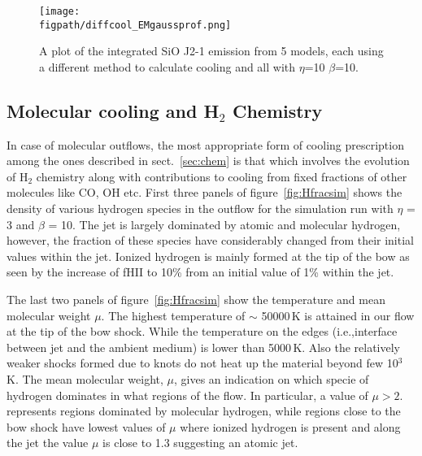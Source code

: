 \documentclass[useAMS,usenatbib,letters]{mn2e}
\newcommand{\figpath}{PFIGS/}
\begin{document}
\begin{figure*}
 \texttt{[image: \\figpath/diffcool\_EMgaussprof.png]}
 \caption{A plot of the integrated SiO J2-1 emission from 5 models, 
each using a different method to calculate cooling and all with $\eta$=10 $\beta$=10.}
\label{cooling2-1} 
\end{figure*}



\subsection{Molecular cooling and H$_2$ Chemistry}
In case of molecular outflows, the most appropriate form of cooling
prescription among the ones described in sect.~\ref{sec:chem} is
that which involves the evolution of H$_2$ chemistry along with
contributions to cooling from fixed fractions of other molecules like
CO, OH etc. First three panels of figure~\ref{fig:Hfracsim} shows the density of
various hydrogen species in the outflow for the simulation run with
$\eta$ = 3 and $\beta$ = 10. The jet is largely dominated by atomic
and molecular hydrogen, however, the fraction of these species have
considerably changed from their initial values within the
jet. Ionized hydrogen is mainly formed at the tip
of the bow as seen by the increase of fHII to 10\% from an initial value of
1\% within the jet.
%
 
The last two panels of figure~\ref{fig:Hfracsim}
show the temperature and mean molecular weight $\mu$. The
highest temperature of $\sim$ 50000\,K is attained in our flow at the
tip of the bow shock. While the temperature on the edges (i.e.,interface between
jet and the ambient medium) is lower than 5000\,K. Also the relatively
weaker shocks formed due to knots do not heat up the material beyond
few 10$^{3}$\, K. The mean molecular weight, $\mu$, gives an indication
on which specie of hydrogen dominates in what regions of the flow. In
particular, a value of $\mu > 2.$ represents regions dominated by
molecular hydrogen, while regions close to the bow shock have lowest
values of $\mu$ where ionized hydrogen is present and along the jet the value
$\mu$ is close to 1.3 suggesting an atomic jet. 
%
\end{document}
